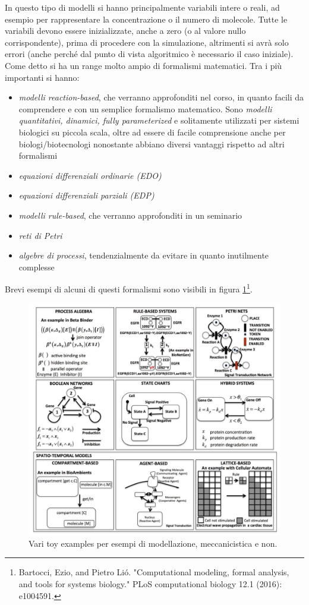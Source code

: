 \documentclass[a4paper,12pt, oneside]{book}
\begin{document}
In questo tipo di modelli si hanno principalmente variabili intere o reali, ad
esempio per rappresentare la concentrazione o il numero di molecole. Tutte le
variabili devono essere inizializzate, anche a zero (o al valore nullo
corrispondente), prima di procedere con la simulazione, altrimenti si avrà solo
errori (anche perché dal punto di vista algoritmico è necessario il caso
iniziale).\\
Come detto si ha un range molto ampio di formalismi matematici. Tra i più
importanti si hanno:
\begin{itemize}
  \item \textit{modelli reaction-based}, che verranno approfonditi nel corso, in
  quanto facili da comprendere e con un semplice formalismo matematico. Sono
  \textit{modelli quantitativi, dinamici, fully parameterized} e solitamente
  utilizzati per sistemi biologici su piccola scala, oltre ad essere di facile
  comprensione anche per biologi/biotecnologi nonostante abbiano diversi
  vantaggi rispetto ad altri formalismi
  \item \textit{equazioni differenziali ordinarie (EDO)} 
  \item \textit{equazioni differenziali parziali (EDP)}
  \item \textit{modelli rule-based}, che verranno approfonditi in un seminario
  \item \textit{reti di Petri}
  \item \textit{algebre di processi}, tendenzialmente da evitare in quanto
  inutilmente complesse
\end{itemize}
Brevi esempi di alcuni di questi formalismi sono visibili in figura
\ref{fig:mecs}\footnote{Bartocci, Ezio, and Pietro Lió. "Computational modeling,
  formal analysis, and tools for systems biology." PLoS computational biology
  12.1 (2016): e1004591.}.
\begin{figure}
  \centering
  \includegraphics[scale = 0.3]{img/mecs.jpg}
  \caption{Vari toy examples per esempi di modellazione, meccanicistica e non.} 
  \label{fig:mecs}
\end{figure}
\end{document}
